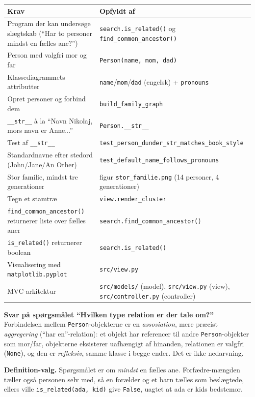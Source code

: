 \documentclass[12pt, a4paper]{article}
\begin{document}
\begin{center}\footnotesize
\begin{tabular}{@{}p{}p{}@{}}
\toprule
\textbf{Krav} & \textbf{Opfyldt af} \\
\midrule
Program der kan undersøge slægtskab (``Har to personer mindst en fælles ane?'')
  & \texttt{search.is\_related()} og \texttt{find\_common\_ancestor()} \\
Person med valgfri mor og far
  & \texttt{Person(name, mom, dad)} \\
Klassediagrammets attributter
  & \texttt{name}/\texttt{mom}/\texttt{dad} (engelsk) + \texttt{pronouns} \\
Opret personer og forbind dem
  & \texttt{build\_family\_graph} \\
\texttt{\_\_str\_\_} à la ``Navn Nikolaj, mors navn er Anne...''
  & \texttt{Person.\_\_str\_\_} \\
Test af \texttt{\_\_str\_\_}
  & \texttt{test\_person\_dunder\_str\_matches\_book\_style} \\
Standardnavne efter stedord (John/Jane/An Other)
  & \texttt{test\_default\_name\_follows\_pronouns} \\
Stor familie, mindst tre generationer
  & figur \texttt{stor\_familie.png} (14 personer, 4 generationer) \\
Tegn et stamtræ
  & \texttt{view.render\_cluster} \\
\texttt{find\_common\_ancestor()} returnerer liste over fælles aner
  & \texttt{search.find\_common\_ancestor()} \\
\texttt{is\_related()} returnerer boolean
  & \texttt{search.is\_related()} \\
Visualisering med \texttt{matplotlib.pyplot}
  & \texttt{src/view.py} \\
MVC-arkitektur
  & \texttt{src/models/} (model), \texttt{src/view.py} (view),
    \texttt{src/controller.py} (controller) \\
\bottomrule
\end{tabular}
\end{center}

\bigskip
\noindent\textbf{Svar på spørgsmålet ``Hvilken type relation er der tale om?''}
Forbindelsen mellem \texttt{Person}-objekterne er en \emph{assosiation},
mere præcist \emph{aggregering} (``har en''-relation): et objekt har referencer
til andre \texttt{Person}-objekter som mor/far, objekterne eksisterer uafhængigt
af hinanden, relationen er valgfri (\texttt{None}), og den er \emph{refleksiv}, samme klasse i begge ender. Det er ikke nedarvning.

\bigskip
\noindent\textbf{Definition-valg.} Spørgsmålet er om \emph{mindst} en fælles
ane. Forfædre-mængden tæller også personen selv med, så en forælder
og et barn tælles som beslægtede, ellers ville \texttt{is\_related(ada, kid)}
give \texttt{False}, uagtet at ada er kids bedstemor.
\end{document}
